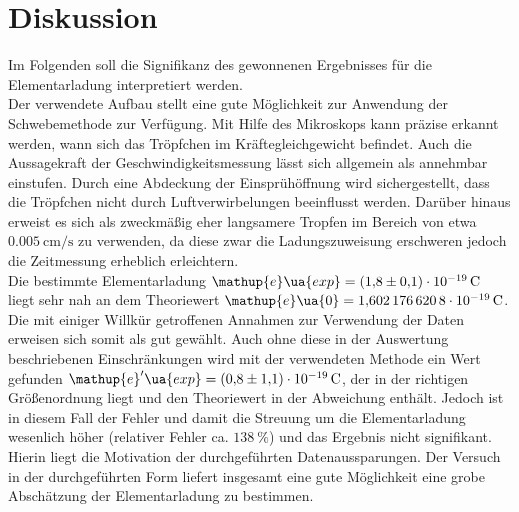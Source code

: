 \newpage \section{Diskussion}
Im Folgenden soll die Signifikanz des gewonnenen Ergebnisses für die Elementarladung interpretiert werden. \\
Der verwendete Aufbau stellt eine gute Möglichkeit zur Anwendung der Schwebemethode zur Verfügung. Mit Hilfe des Mikroskops
kann präzise erkannt werden, wann sich das Tröpfchen im Kräftegleichgewicht befindet. Auch die Aussagekraft der Geschwindigkeitsmessung lässt
sich allgemein als annehmbar einstufen. Durch eine Abdeckung der Einsprühöffnung wird sichergestellt, dass die
Tröpfchen nicht durch Luftverwirbelungen beeinflusst werden. Darüber hinaus erweist es sich als zweckmäßig eher langsamere Tropfen
im Bereich von etwa $\SI{0.005}{\centi\meter \per \second}$ zu verwenden, da diese zwar die Ladungszuweisung
erschweren jedoch die Zeitmessung erheblich erleichtern. \\
Die bestimmte Elementarladung $\mathup{e}\ua{exp} = \SI{+1.8(1)e-19}{\coulomb}$ liegt sehr nah an dem Theoriewert
$\mathup{e}\ua{0} = \SI{1.6021766208e-19}{\coulomb}$. Die mit einiger Willkür getroffenen Annahmen zur Verwendung der Daten erweisen sich
somit als gut gewählt. Auch ohne diese in der Auswertung beschriebenen Einschränkungen wird mit der verwendeten Methode ein Wert gefunden
$\mathup{e}'\ua{exp} = \SI{+0.8(11)e-19}{\coulomb}$, der in der richtigen Größenordnung liegt und den Theoriewert in der Abweichung enthält. Jedoch ist in
diesem Fall der Fehler und damit die Streuung um die Elementarladung wesenlich höher (relativer Fehler ca. $\SI{138}{\percent}$) und das Ergebnis %
nicht signifikant. Hierin liegt die Motivation der durchgeführten Datenaussparungen. %
Der Versuch in der durchgeführten Form liefert insgesamt eine gute Möglichkeit eine grobe Abschätzung der Elementarladung zu bestimmen.
